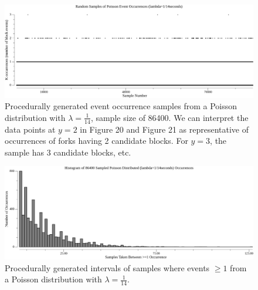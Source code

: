 \documentclass[11pt]{article}
\theoremstyle{plain}
\begin{document}
\begin{figure}[tph]
    \label{vis_poisson_samples_events_86400}
    \centering
    \includegraphics[width=1.0\textwidth]{go-block-step/out/vis_poisson_samples_events_86400.png}
    \caption{
        Procedurally generated event occurrence samples from a Poisson distribution
        with $\lambda = \frac{1}{14}$, sample size of 86400.
        We can interpret the data points at $y=2$ in Figure 20 and Figure 21 as
        representative of occurrences of forks having 2 candidate blocks.
        For $y=3$, the sample has 3 candidate blocks, etc.
    }
\end{figure}

\begin{figure}[tph]
    \label{vis_poisson_samples_eventintervals_hist}
    \centering
\includegraphics[width=1.0\textwidth]{go-block-step/out/vis_poisson_samples_eventintervals_hist.png}
    \caption{
      Procedurally generated intervals of samples where events $\geq 1$ from
        a Poisson distribution with $\lambda = \frac{1}{14}$.
    }
\end{figure}


%
\end{document}
